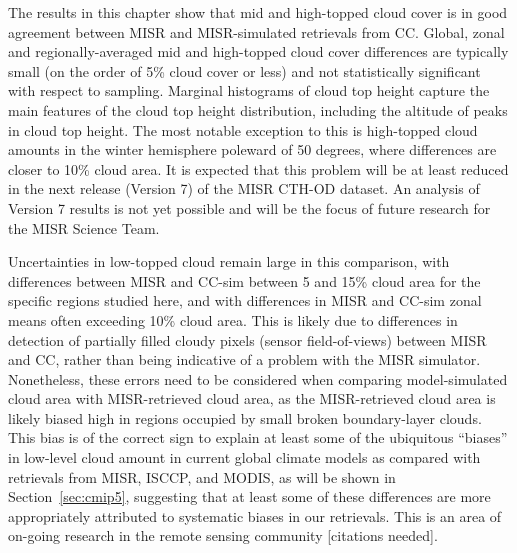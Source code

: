 The results in this chapter show that mid and high-topped cloud cover is
in good agreement between MISR and MISR-simulated retrievals from CC.
Global, zonal and regionally-averaged mid and high-topped cloud cover
differences are typically small (on the order of 5\% cloud cover or
less) and not statistically significant with respect to sampling.
Marginal histograms of cloud top height capture the main features of the
cloud top height distribution, including the altitude of peaks in cloud
top height. The most notable exception to this is high-topped cloud
amounts in the winter hemisphere poleward of 50 degrees, where
differences are closer to 10\% cloud area. It is expected that this
problem will be at least reduced in the next release (Version 7) of the
MISR CTH-OD dataset. An analysis of Version 7 results is not yet
possible and will be the focus of future research for the MISR Science
Team.

Uncertainties in low-topped cloud remain large in this comparison, with
differences between MISR and CC-sim between 5 and 15\% cloud area for
the specific regions studied here, and with differences in MISR and
CC-sim zonal means often exceeding 10\% cloud area. This is likely due
to differences in detection of partially filled cloudy pixels (sensor
field-of-views) between MISR and CC, rather than being indicative of a
problem with the MISR simulator. Nonetheless, these errors need to be
considered when comparing model-simulated cloud area with MISR-retrieved
cloud area, as the MISR-retrieved cloud area is likely biased high in
regions occupied by small broken boundary-layer clouds. This bias is of
the correct sign to explain at least some of the ubiquitous ``biases''
in low-level cloud amount in current global climate models as compared
with retrievals from MISR, ISCCP, and MODIS, as will be shown in
Section~\ref{sec:cmip5}, suggesting that at least some of these
differences are more appropriately attributed to systematic biases in
our retrievals. This is an area of on-going research in the remote
sensing community {[}citations needed{]}.

